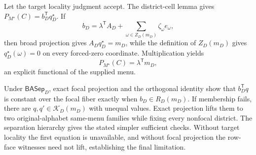 Let the target locality judgment accept.  The district-cell lemma gives \(P_{M^\star}(C)=b_D^{\mathsf T}q_D^\star\).  If
\[
b_D=\lambda^{\mathsf T}A_D+
\sum_{\omega\in Z_D(m_D)}\zeta_\omega e_\omega,
\]
then broad projection gives \(A_Dq_D^\star=m_D\), while the definition of \(Z_D(m_D)\) gives \(q_D^\star(\omega)=0\) on every forced-zero coordinate.  Multiplication yields
\[
P_{M^\star}(C)=\lambda^{\mathsf T}m_D,
\]
an explicit functional of the supplied menu.

Under \(\mathsf{BASep}_D\), exact focal projection and the orthogonal identity show that \(b_D^{\mathsf T}q\) is constant over the focal fiber exactly when \(b_D\in R_D(m_D)\).  If membership fails, there are \(q,q'\in\mathcal K_D(m_D)\) with unequal values.  Exact projection lifts them to two original-alphabet same-menu families while fixing every nonfocal district.  The separation hierarchy gives the stated simpler sufficient checks.  Without target locality the first equation is unavailable, and without focal projection the row-face witnesses need not lift, establishing the final limitation.